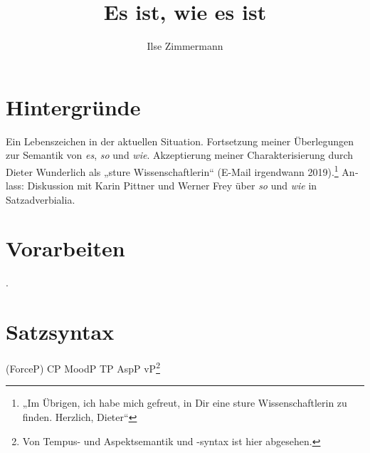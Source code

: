 \documentclass[output=paper, colorlinks, citecolor=brown, booklanguage=german]{langscibook}
\author{Ilse Zimmermann\affiliation{\affiliation{Zentrum für Allgemeine Sprachwissenschaft (ZAS), Berlin}}}
\title{Es ist, wie es ist}
\begin{document}
\begin{otherlanguage}{german}
\maketitle
{}



\section{Hintergründe} 

Ein Lebenszeichen in der aktuellen Situation. \newline
Fortsetzung meiner Überlegungen zur Semantik von  \textit{es},  \textit{so} und  \textit{wie}. \newline
Akzeptierung meiner Charakterisierung durch Dieter Wunderlich als „sture Wissenschaftlerin“ (E-Mail irgendwann 2019).\footnote{„Im Übrigen, ich habe mich gefreut, in Dir eine sture Wissenschaftlerin zu finden. \newline Herzlich, Dieter“} \newline
Anlass: Diskussion mit Karin Pittner und Werner Frey über \textit{so} und \textit{wie} in Satzadverbialia.

\section{Vorarbeiten}

\citet{zi20:Zimmermann1991,Zimmermann1995,Zimmermann1997,zi20:Zimmermann2000,Zimmermann2008,zi20:Zimmermann2016}. 

\section{Satzsyntax}

\ea (ForceP) CP MoodP TP AspP vP\footnote{Von Tempus- und Aspektsemantik und -syntax ist hier abgesehen.}
\z


\end{otherlanguage}
\end{document}
